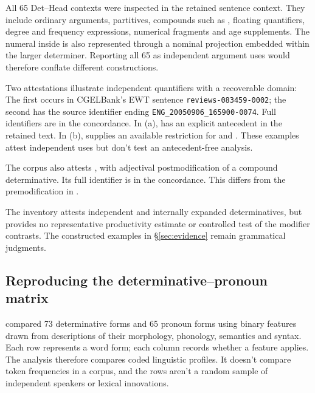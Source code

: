 \documentclass[12pt]{article}
\begin{document}
All 65 Det--Head contexts were inspected in the retained sentence context. They include ordinary arguments, partitives, compounds such as , floating quantifiers, degree and frequency expressions, numerical fragments and age supplements. The numeral inside  is also represented through a nominal projection embedded within the larger determiner. Reporting all 65 as independent argument uses would therefore conflate different constructions.

Two attestations illustrate independent quantifiers with a recoverable domain:
\ea\label{ex:attested-quantifiers}
\ea {}
\ex {}
\z\z
The first occurs in CGELBank's EWT sentence \nolinkurl{reviews-083459-0002}; the second has the source identifier ending \texttt{ENG\_20050906\_165900-0074}. Full identifiers are in the concordance. In (a),  has an explicit antecedent in the retained text. In (b),  supplies an available restriction for  and . These examples attest independent uses but don't test an antecedent-free analysis.

The corpus also attests , with adjectival postmodification of a compound determinative. Its full identifier is in the concordance. This differs from the premodification in .

The inventory attests independent and internally expanded determinatives, but provides no representative productivity estimate or controlled test of the modifier contrasts. The constructed examples in §\ref{sec:evidence} remain grammatical judgments.

\subsection{Reproducing the determinative--pronoun matrix}

\textcite{reynolds2021} compared 73 determinative forms and 65 pronoun forms using binary features drawn from descriptions of their morphology, phonology, semantics and syntax. Each row represents a word form; each column records whether a feature applies. The analysis therefore compares coded linguistic profiles. It doesn't compare token frequencies in a corpus, and the rows aren't a random sample of independent speakers or lexical innovations.
\end{document}

